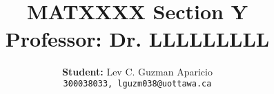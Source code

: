 \documentclass[12pt, lettersize]{article}
\title{\Large \centering{Assignment P \thanks{All pages in this assignment are double sided} } \\ \large \textbf{ MATXXXX Section Y \\  Professor: Dr. LLLLLLLLL} }
\author{ \large \textbf{Student:} Lev C. Guzman Aparicio \\ 
	\texttt{300038033, lguzm038@uottawa.ca}}
\theoremstyle{Remark}
\begin{document}
	\begin{titlepage}
		\maketitle 
	\end{titlepage}
	
\end{document}

